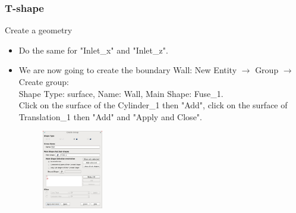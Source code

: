 \documentclass[10pt]{beamer}
\begin{document}
\begin{frame}
\frametitle{T-shape}
\begin{block}{Create a geometry}

\begin{itemize}
\item Do the same for "Inlet\_x" and "Inlet\_z".
\item We are now going to create the boundary Wall: New Entity $\rightarrow$ Group $\rightarrow$ Create group:\\
Shape Type: surface, Name: Wall, Main Shape: Fuse\_1.\\
Click on the surface of the Cylinder\_1 then "Add", click on the surface of Translation\_1 then "Add" and "Apply and Close".
\begin{figure}
\includegraphics[width=0.25\textwidth]{PICTURES/salome16.jpg}
\end{figure}
\end{itemize}

\end{block}
\end{frame}
\end{document}
